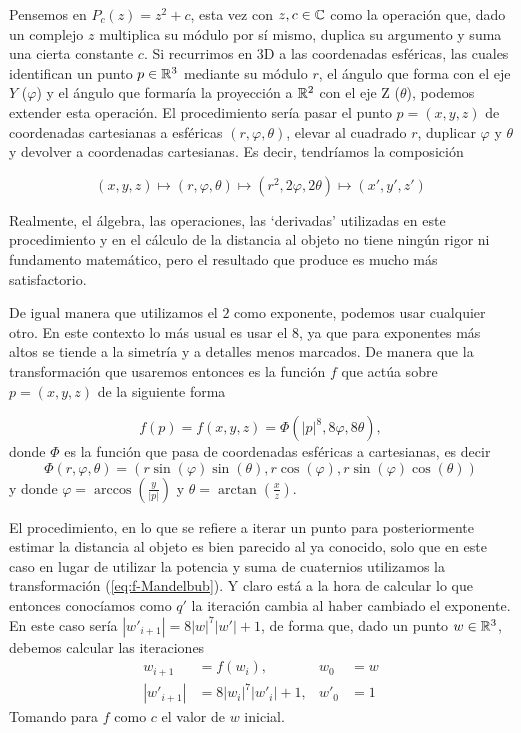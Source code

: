 Pensemos en $P_c(z)=z^2+c$, esta vez con $z,c\in\mathbb{C}$ como la operación que, dado un complejo $z$ multiplica su módulo por sí mismo, duplica su argumento y suma una cierta constante $c$. Si recurrimos en 3D a las coordenadas esféricas, las cuales identifican un punto $p\in\mathbb{R}^3$ mediante su módulo $r$, el ángulo que forma con el eje $Y$ ($\varphi$) y el ángulo que formaría la proyección a $\mathbb{R}^2$ con el eje Z ($\theta$), podemos extender esta operación. El procedimiento sería pasar el punto $p=(x,y,z)$ de coordenadas cartesianas a esféricas $(r,\varphi,\theta)$, elevar al cuadrado $r$, duplicar $\varphi$ y $\theta$ y devolver a coordenadas cartesianas. Es decir, tendríamos la composición 

$$
(x,y,z)\longmapsto(r,\varphi,\theta)\longmapsto(r^2,2\varphi,2\theta)\longmapsto(x',y',z')
$$

Realmente, el álgebra, las operaciones, las `derivadas' utilizadas en este procedimiento y en el cálculo de la distancia al objeto no tiene ningún rigor ni fundamento matemático, pero el resultado que produce es mucho más satisfactorio.

De igual manera que utilizamos el $2$ como exponente, podemos usar cualquier otro. En este contexto lo más usual es usar el 8, ya que para exponentes más altos se tiende a la simetría y a detalles menos marcados. De manera que la transformación que usaremos entonces es la función $f$ que actúa sobre $p=(x,y,z)$ de la siguiente forma

\begin{equation}
    \label{eq:f-Mandelbub}
    f(p)=f(x,y,z) = \Phi(|p|^8,8\varphi, 8\theta),
\end{equation}
donde $\Phi$ es la función que pasa de coordenadas esféricas a cartesianas, es decir
$$
\Phi(r,\varphi,\theta) = (r\sin(\varphi)\sin(\theta),r\cos(\varphi),r\sin(\varphi)\cos(\theta))
$$
y donde $\varphi = \arccos(\frac{y}{|p|})$ y $\theta=\arctan(\frac{x}{z})$.

El procedimiento, en lo que se refiere a iterar un punto para posteriormente estimar la distancia al objeto es bien parecido al ya conocido, solo que en este caso en lugar de utilizar la potencia y suma de cuaternios utilizamos la transformación (\ref{eq:f-Mandelbub}). Y claro está a la hora de calcular lo que entonces conocíamos como $q'$ la iteración cambia al haber cambiado el exponente. En este caso sería $|w'_{i+1}|=8|w|^7|w'|+1$, de forma que, dado un punto $w\in\mathbb{R}^3$, debemos calcular las iteraciones 
\begin{align*}
    w_{i+1} &= f(w_i), & w_0&=w \\
    |w'_{i+1}| &= 8|w_i|^7|w'_i|+1, & w'_0&=1
\end{align*}
Tomando para $f$ como $c$ el valor de $w$ inicial.

